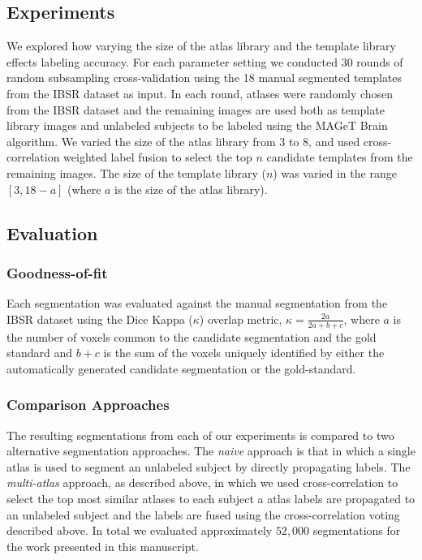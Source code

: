 \documentclass{article}
\begin{document}
\subsection{Experiments}

We explored how varying the size of the atlas library and the template library
effects labeling accuracy.  For each parameter setting we conducted 30 rounds
of random subsampling cross-validation using the 18 manual segmented templates
from the IBSR dataset as input. In each round, atlases were randomly chosen
from the IBSR dataset and the remaining images are used both as template
library images and unlabeled subjects to be labeled using the MAGeT Brain
algorithm.  We varied the size of the atlas library from 3 to 8, and used
cross-correlation weighted label fusion to select the top $n$ candidate
templates from the remaining images.  The size of the template library ($n$)
was varied in the range $[3, 18-a]$ (where $a$ is the size of the atlas
library).

\subsection{Evaluation}
\subsubsection{Goodness-of-fit}
Each segmentation was evaluated against the manual segmentation from the IBSR
dataset using the Dice Kappa ($\kappa$) overlap metric, $\kappa =
\frac{2a}{2a+b+c}$, where $a$ is the number of voxels common to the candidate
segmentation and the gold standard and $b+c$ is the sum of the voxels uniquely
identified by either the automatically generated candidate segmentation or the
gold-standard.

\subsubsection{Comparison Approaches}
The resulting segmentations from each of our experiments is compared to two
alternative segmentation approaches. The {\it naive} approach is that in  which
a single atlas is used to segment an unlabeled subject by directly propagating
labels.  The {\it multi-atlas} approach, as described above, in which we used
cross-correlation to select the top most similar atlases to each subject a
atlas
labels are propagated to an unlabeled subject and the labels are fused using
the cross-correlation voting described above.  In total we evaluated
approximately $52,000$ segmentations for the work presented in this manuscript.
\end{document}
